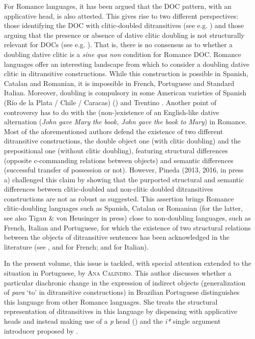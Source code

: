 \documentclass[output=paper,modfonts,nonflat,colorlinks,citecolor=brown]{langsci/langscibook}
\begin{document}
For Romance languages, it has been argued that the DOC pattern, with an applicative head, is also attested. This gives rise to two different perspectives: those identifying the DOC with clitic-doubled ditransitives (see e.g. \citealt{Cuervo2003}) and those arguing that the presence or absence of dative clitic doubling is not structurally relevant for DOCs (see e.g. \citealt{Pineda2013, Pineda2016, PinedaPress}). That is, there is no consensus as to whether a doubling dative clitic is a {\textit{sine qua non}} condition for Romance DOC. Romance languages offer an interesting landscape from which to consider a doubling dative clitic in ditransitive constructions. While this construction is possible in Spanish, Catalan and Romanian, it is impossible in French, Portuguese and Standard Italian. Moreover, doubling is compulsory in some American varieties of Spanish (Río de la Plata / Chile / Caracas) (\citealt{Parodi1998,Senn2008,Pujalte2009}) and Trentino \citep{Cordin1993}. Another point of controversy has to do with the (non-)existence of an English-like dative alternation (\textit{John gave Mary the book, John gave the book to Mary}) in Romance. Most of the aforementioned authors defend the existence of two different ditransitive constructions, the double object one (with clitic doubling) and the prepositional one (without clitic doubling), featuring structural differences (opposite c-commanding relations between objects) and semantic differences (successful transfer of possession or not). However, Pineda (2013, 2016, in press a) challenged this claim by showing that the purported structural and semantic differences between clitic-doubled and non-clitic doubled ditransitives constructions are not as robust as suggested. This assertion brings Romance clitic-doubling languages such as Spanish, Catalan or Romanian (for the latter, see also Tigau \& von Heusinger in press) close to non-doubling languages, such as French, Italian and Portuguese, for which the existence of two structural relations between the objects of ditransitive sentences has been acknowledged in the literature (see \citealt{Harley2002,Anagnostopoulou2003,Fournier2010}, and \citealt{BonehNash2011} for French; and \citealt{GiorgiLongobardi1991,McGinnis2001,Harley2002} for Italian).



In the present volume, this issue is tackled, with special attention extended to the situation in Portuguese, by {\textsc{Ana Calindro.}}  This author discusses whether a particular diachronic change in the expression of indirect objects (generalization of {\textit{para}} ‘to’ in ditransitive constructions) in Brazilian Portuguese distinguishes this language from other Romance languages. She treats the structural representation of ditransitives in this language by dispensing with applicative heads and instead making use of a {\textit{p}} head (\citealt{Svenonius2003, Svenonius2004Arguments, Wood2012}) and the {\textit{i*}} single argument introducer proposed by \citet{WoodMarantz2017}.
\end{document}
